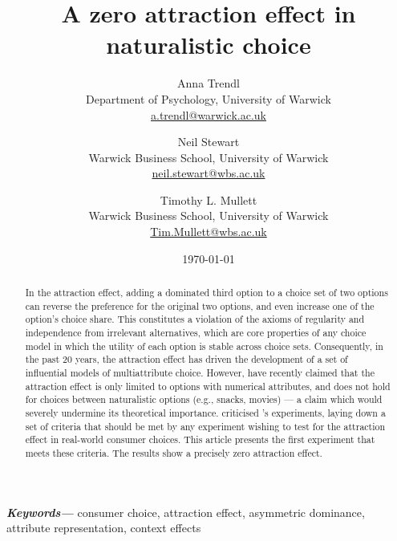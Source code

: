 \documentclass[12pt, a4paper]{article}
\title{}
\author{}
\date{}
\providecommand{\keywords}[1]{\textbf{\textit{Keywords---}} #1}
\begin{document}
\title{A zero attraction effect in naturalistic choice}

\author{Anna Trendl\\Department of Psychology, University of Warwick  \\  \href{mailto:a.trendl@warwick.ac.uk}{a.trendl@warwick.ac.uk}
\and Neil Stewart \\Warwick Business School, University of Warwick \\  \href{mailto:neil.stewart@wbs.ac.uk}{neil.stewart@wbs.ac.uk}
\and Timothy L. Mullett\\Warwick Business School, University of Warwick\\  \href{mailto:Tim.Mullett@wbs.ac.uk}{Tim.Mullett@wbs.ac.uk} }

\date{\today}


\begin{titlepage}
\maketitle

\newpage

\begin{abstract}
In the attraction effect, adding a dominated third option to a choice set of two options can reverse the preference for the original two options, and even increase one of the option's choice share. This constitutes a violation of the axioms of regularity and independence from irrelevant alternatives, which are core properties of any choice model in which the utility of each option is stable across choice sets. Consequently, in the past 20 years, the attraction effect has driven the development of a set of influential models of multiattribute choice. However,  have recently claimed that the attraction effect is only limited to options with numerical attributes, and does not hold for choices between naturalistic options (e.g., snacks, movies) --- a claim which would severely undermine its theoretical importance.  criticised \citeauthor{Frederick2014}'s experiments, laying down a set of criteria that should be met by any experiment wishing to test for the attraction effect in real-world consumer choices. This article presents the first experiment that meets these criteria. The results show a precisely zero attraction effect.
\end{abstract}
\keywords{consumer choice, attraction effect, asymmetric dominance, attribute representation,  context effects}


\end{titlepage}
\end{document}
